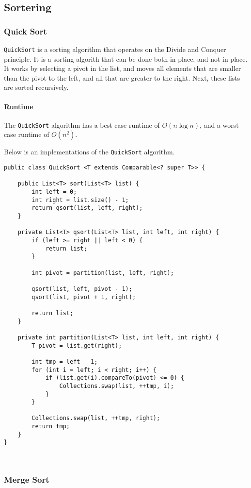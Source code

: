 \documentclass{article}
\begin{document}
    \subsection{Sortering}
    \subsubsection{Quick Sort}
    \texttt{QuickSort} is a sorting algorithm that operates on the Divide and Conquer principle. It is a sorting algorith that can be done both in place, and not in place. It works by selecting a pivot in the list, and moves all elements that are smaller than the pivot to the left, and all that are greater to the right. Next, these lists are sorted recursively.
\medskip

\paragraph{Runtime} The \texttt{QuickSort} algorithm has a best-case runtime of \( O(n \log n) \), and a worst case runtime of \( O\left( n^2 \right) \).
\medskip

Below is an implementations of the \texttt{QuickSort} algorithm.
    \begin{lstlisting}
public class QuickSort <T extends Comparable<? super T>> {

    public List<T> sort(List<T> list) {
        int left = 0;
        int right = list.size() - 1;
        return qsort(list, left, right);
    }

    private List<T> qsort(List<T> list, int left, int right) {
        if (left >= right || left < 0) {
            return list;
        }

        int pivot = partition(list, left, right);

        qsort(list, left, pivot - 1);
        qsort(list, pivot + 1, right);

        return list;
    }

    private int partition(List<T> list, int left, int right) {
        T pivot = list.get(right);

        int tmp = left - 1;
        for (int i = left; i < right; i++) {
            if (list.get(i).compareTo(pivot) <= 0) {
                Collections.swap(list, ++tmp, i);
            }
        }

        Collections.swap(list, ++tmp, right);
        return tmp;
    }
}

        
    \end{lstlisting}
    \subsubsection{Merge Sort}
\end{document}
